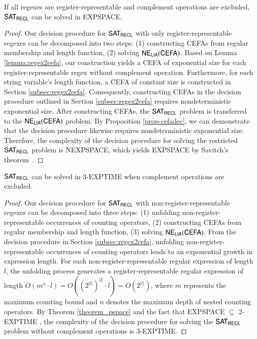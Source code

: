 {\begin{theorem}\label{theorem_pspace}
    If all regexes are register-representable and complement operations are excluded, ${\sf SAT_{RECL}}$ can be solved in EXPSPACE.
\end{theorem}
\begin{proof}
    Our decision procedure for ${\sf SAT_{RECL}}$ with only register-representable regexes can be decomposed into two steps: (1) constructing CEFAs from regular membership and length function, (2) solving ${\sf NE_{LIA}(CEFA)}$.
    Based on Lemma \ref{lemma:regex2cefa}, our construction yields a CEFA of exponential size for each register-representable regex without complement operation. Furthermore, for each string variable's length function, a CEFA of constant size is constructed in Section \ref{subsec:regex2cefa}.
    Consequently, constructing CEFAs in the decision procedure outlined in Section \ref{subsec:regex2cefa} requires nondeterministic exponential size. After constructing CEFAs, the ${\sf SAT_{RECL}}$ problem is transferred to the ${\sf NE_{LIA}(CEFA)}$ problem. By Proposition \ref{prop-cefadec}, we can demonstrate that the decision procedure likewise requires nondeterministic exponential size. Therefore, the complexity of the decision procedure for solving the restricted ${\sf SAT_{RECL}}$ problem is NEXPSPACE, which yields EXPSPACE by Savitch's theorem~\cite{complexity-book}.
\end{proof}

\begin{theorem}
    ${\sf SAT_{RECL}}$ can be solved in 3-EXPTIME when complement operations are excluded.
\end{theorem}

\begin{proof}
    Our decision procedure for ${\sf SAT_{RECL}}$ with non-register-representable regexes can be decomposed into three steps: (1) unfolding non-register-representable occurrences of counting operators, (2) constructing CEFAs from regular membership and length function, (3) solving ${\sf NE_{LIA}(CEFA)}$.
    From the decision procedure in Section \ref{subsec:regex2cefa}, unfolding non-register-representable occurrences of counting operators leads to an exponential growth in expression length. For each non-register-representable regular expression of length $l$, the unfolding process generates a register-representable regular expression of length $O(m^n\cdot l)=O((2^{|l|})^{|l|}\cdot l) = O(2^{|l|})$, where $m$ represents the maximum counting bound and $n$ denotes the maximum depth of nested counting operators. By Theorem \ref{theorem_pspace} and the fact that EXPSPACE $\subseteq$ 2-EXPTIME \cite{complexity-book}, the complexity of the decision procedure for solving the ${\sf SAT_{RECL}}$ problem without complement operations is 3-EXPTIME.
\end{proof}
}
